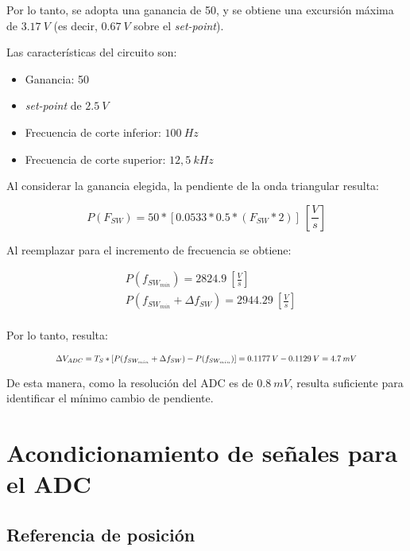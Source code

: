 \noindent Por lo tanto, se adopta una ganancia de 50, y se obtiene una excursión máxima de $3.17\:V$ (es decir, $0.67\:V$ sobre el \textsl{set-point}).


\noindent Las características del circuito son:

\begin{itemize}
	\item Ganancia: 50
	\item \textsl{set-point} de $2.5\:V$
	\item Frecuencia de corte inferior: $100\:Hz$
	\item Frecuencia de corte superior: $12,5\:kHz$
\end{itemize}

\noindent Al considerar la ganancia elegida,  la pendiente de la onda triangular resulta:

\begin{equation} 
	P(F_{SW}) = 50 * [0.0533 * 0.5 * (F_{SW}*2)]\:[\frac{V}{s}]
\end{equation}

\noindent Al reemplazar para el incremento de frecuencia se obtiene: 

\begin{equation} 
	\begin{aligned}
		&P(f_{SW_{min}}) = 2824.9 \: [\frac{V}{s}]\\
		&P(f_{SW_{min}} + \Delta f_{SW}) = 2944.29 \: [\frac{V}{s}]\\		 
	\end{aligned}
\end{equation}

\noindent Por lo tanto, resulta:


\begin{equation} 
	\resizebox{.8\hsize}{!}
	{
	$\Delta V_{ADC} = T_S * [P(f_{SW_{min}} + \Delta f_{SW}) - P(f_{SW_{min}})] = 0.1177\:V - 0.1129\:V = 4.7\:mV$
	}
\end{equation}


\noindent De esta manera, como la resolución del ADC es de $0.8\:mV$, resulta suficiente para identificar el mínimo cambio de pendiente.


\section{Acondicionamiento de señales para el ADC}

\subsection{Referencia de posición}

